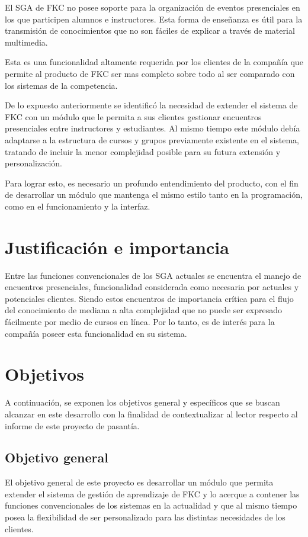 El \gls{SGA} de \gls{FKC} no posee soporte para la organización de eventos presenciales en los que participen alumnos e instructores. Esta forma de enseñanza es útil para la transmisión de conocimientos que no son fáciles de explicar a través de material multimedia.

Esta es una funcionalidad altamente requerida por los clientes de la compañía que permite al producto de FKC ser mas completo sobre todo al ser comparado con los sistemas de la competencia.

De lo expuesto anteriormente se identificó la necesidad de extender el sistema de \gls{FKC} con un módulo que le permita a sus clientes gestionar encuentros presenciales entre instructores y estudiantes. Al mismo tiempo este módulo debía adaptarse a la estructura de cursos y grupos previamente existente en el sistema, tratando de incluir la menor complejidad posible para su futura extensión y personalización.

Para lograr esto, es necesario un profundo entendimiento del producto, con el fin de desarrollar un módulo que mantenga el mismo estilo tanto en la programación, como en el funcionamiento y la interfaz. 

\section*{Justificación e importancia}
Entre las funciones convencionales de los \gls{SGA} actuales se encuentra el manejo de encuentros presenciales, funcionalidad considerada como necesaria por actuales y potenciales clientes. Siendo estos encuentros de importancia crítica para el flujo del conocimiento de mediana a alta complejidad que no puede ser expresado fácilmente por medio de cursos en línea. Por lo tanto, es de interés para la compañía poseer esta funcionalidad en su sistema.

\section*{Objetivos}
A continuación, se exponen los objetivos general y específicos que se buscan alcanzar en este desarrollo con la finalidad de contextualizar al lector respecto al informe de este proyecto de pasantía.

\subsection*{Objetivo general}
El objetivo general de este proyecto es desarrollar un módulo que permita extender el sistema de gestión de aprendizaje de \gls{FKC} y lo acerque a contener las funciones convencionales de los sistemas en la actualidad y que al mismo tiempo posea la flexibilidad de ser personalizado para las distintas necesidades de los clientes.

